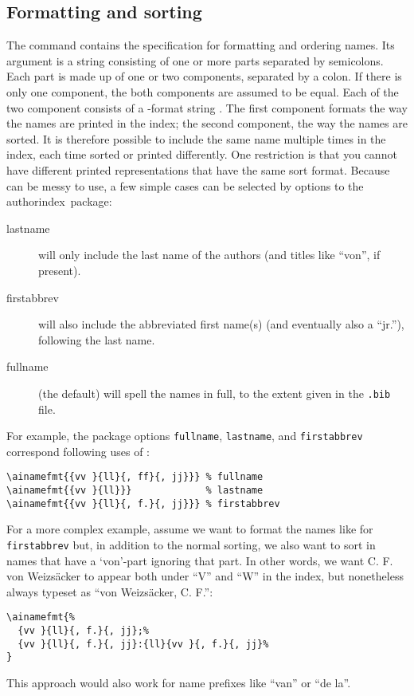 \documentclass[a4paper]{article}
\newcommand{\package}[1]{\textsf{#1}}
\newcommand{\authorindex}{\package{authorindex}}
\newcommand{\file}[1]{\texttt{#1}}
\newcommand{\fnext}[1]{\file{.#1}}
\newcommand{\ltxinp}[1]{\texttt{\string#1}}
\begin{document}
\subsection{Formatting and sorting}

The command \ltxinp{\ainamefmt} contains the specification for formatting and
ordering names. Its argument is a string consisting of one or more parts
separated by semicolons.  Each part is made up of one or two components,
separated by a colon.  If there is only one component, the both components are
assumed to be equal.  Each of the two component consists of a \BibTeX-format
string \cite{Patashnik88b}. The first component formats the way the names are
printed in the index; the second component, the way the names are sorted.  It
is therefore possible to include the same name multiple times in the index,
each time sorted or printed differently. One restriction is that you cannot
have different printed representations that have the same sort format. Because
\ltxinp{\ainamefmt} can be messy to use, a few simple cases can be selected by
options to the \authorindex\ package: {\small
\begin{description}
\item[lastname] will only include the last name of the authors (and titles like
  ``von'', if present).
\item[firstabbrev] will also include the abbreviated first name(s) (and
  eventually also a ``jr.''), following the last name.
\item[fullname] (the default) will spell the names in full, to the extent given
  in the \fnext{bib} file.
\end{description}}

For example, the package options \ltxinp{fullname}, \ltxinp{lastname}, and
\ltxinp{firstabbrev} correspond following uses of \ltxinp{\ainamefmt}:
\begin{verbatim}
\ainamefmt{{vv }{ll}{, ff}{, jj}}} % fullname
\ainamefmt{{vv }{ll}}}             % lastname
\ainamefmt{{vv }{ll}{, f.}{, jj}}} % firstabbrev
\end{verbatim}
For a more complex example, assume we want to format the names like for
\ltxinp{firstabbrev} but, in addition to the normal sorting, we also want to
sort in names that have a `von'-part ignoring that part.  In other words, we
want C. F. von Weizs\"{a}cker to appear both under ``V'' and ``W'' in the
index, but nonetheless always typeset as ``von Weizs\"{a}cker, C. F.'':
\begin{verbatim}
\ainamefmt{%
  {vv }{ll}{, f.}{, jj};%
  {vv }{ll}{, f.}{, jj}:{ll}{vv }{, f.}{, jj}%
}
\end{verbatim}
This approach would also work for name prefixes like ``van'' or ``de la''.
\end{document}
